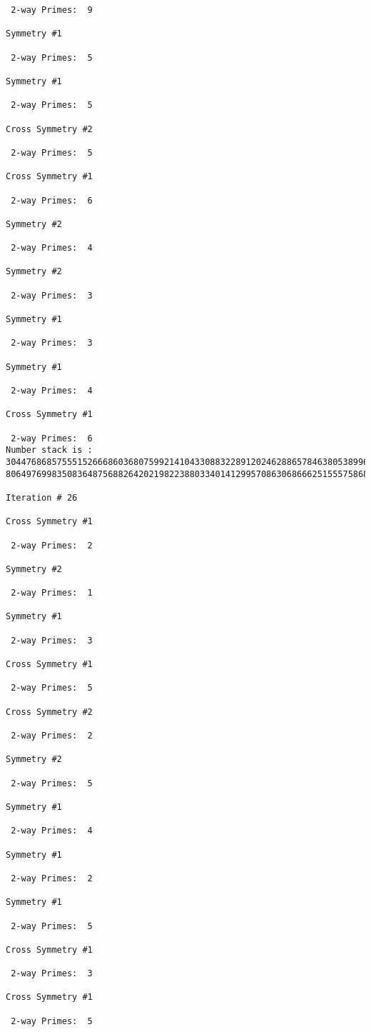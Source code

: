 \begin{verbatim}
 2-way Primes: 	9

Symmetry #1

 2-way Primes: 	5

Symmetry #1

 2-way Primes: 	5

Cross Symmetry #2

 2-way Primes: 	5

Cross Symmetry #1

 2-way Primes: 	6

Symmetry #2

 2-way Primes: 	4

Symmetry #2

 2-way Primes: 	3

Symmetry #1

 2-way Primes: 	3

Symmetry #1

 2-way Primes: 	4

Cross Symmetry #1

 2-way Primes: 	6
Number stack is :
30447686857555152666860368075992141043308832289120246288657846380538996794608835958544046240163340857
80649769983508364875688264202198223880334014129957086306866625155575868674403758043361042640445859538

Iteration #	26

Cross Symmetry #1

 2-way Primes: 	2

Symmetry #2

 2-way Primes: 	1

Symmetry #1

 2-way Primes: 	3

Cross Symmetry #1

 2-way Primes: 	5

Cross Symmetry #2

 2-way Primes: 	2

Symmetry #2

 2-way Primes: 	5

Symmetry #1

 2-way Primes: 	4

Symmetry #1

 2-way Primes: 	2

Symmetry #1

 2-way Primes: 	5

Cross Symmetry #1

 2-way Primes: 	3

Cross Symmetry #1

 2-way Primes: 	5


\end{verbatim}
